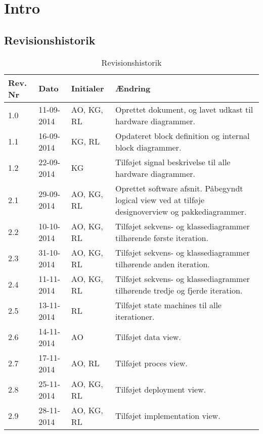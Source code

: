 \chapter{Intro}

\section{Revisionshistorik}
\begin{table}[H]
	\centering
		\begin{tabular}{|p{1.7 cm}|p{2 cm}|p{2.5 cm}|p{6.8 cm}|} 
		\hline
			\textbf{Rev. Nr} & \textbf{Dato}		& \textbf{Initialer} 	& \textbf{Ændring} \\ \hline
			1.0 	& 11-09-2014 & AO, KG, RL  & Oprettet dokument, og lavet udkast til hardware diagrammer.  \\ \hline
			1.1 	& 16-09-2014 & KG, RL  & Opdateret block definition og internal block diagrammer. 	\\ \hline
			1.2 	& 22-09-2014 & KG  & Tilføjet signal beskrivelse til alle hardware diagrammer. 	\\ \hline
			
			2.1 	& 29-09-2014 & AO, KG, RL  & Oprettet software afsnit. Påbegyndt logical view ved at tilføje designoverview og pakkediagrammer.	\\ \hline
			2.2 	& 10-10-2014 & AO, KG, RL  & Tilføjet sekvens- og klassediagrammer tilhørende første iteration.	\\ \hline
			2.3 	& 31-10-2014 & AO, KG, RL  & Tilføjet sekvens- og klassediagrammer tilhørende anden iteration.	\\ \hline
			2.4 	& 11-11-2014 & AO, KG, RL  & Tilføjet sekvens- og klassediagrammer tilhørende tredje og fjerde iteration.	\\ \hline
			2.5 	& 13-11-2014 & RL  & Tilføjet state machines til alle iterationer.	\\ \hline
			2.6 	& 14-11-2014 & AO  & Tilføjet data view.	\\ \hline
			2.7 	& 17-11-2014 & AO, RL  		& Tilføjet proces view.	\\ \hline
			2.8 	& 25-11-2014 & AO, KG, RL  & Tilføjet deployment view.	\\ \hline
			2.9 	& 28-11-2014 & AO, KG, RL  & Tilføjet implementation view.	\\ \hline
		\end{tabular}
	\caption{Revisionshistorik}
\end{table}


\vspace{1.5cm}

